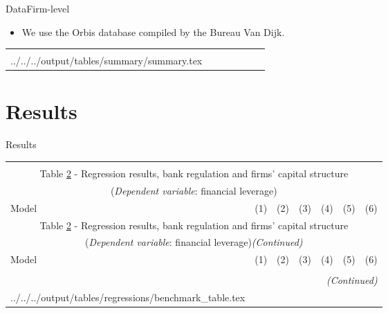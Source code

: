 \documentclass{beamer}
\makeatletter
\newcommand\primitiveinput[1]
{\@@input #1 }
\makeatother
\begin{document}
\begin{frame}{Data}{Firm-level}
\begin{itemize}
	\item We use the Orbis database compiled by the Bureau Van Dijk.
	
	
\end{itemize}
\begin{center}
	\begin{tiny}	
		\begin{longtable}{lcccccc}\\
			\label{reg:benchmark}\\
		\primitiveinput{../../../output/tables/summary/summary.tex}
			\hline 			
	\end{longtable}	
	\end{tiny}
\end{center}
\end{frame}

\section{Results}

\begin{frame}{Results}

{\fontsize{6}{7}\selectfont		
\begin{longtable}{lcccccc}\\
	\label{reg:benchmark}\\
	\multicolumn{7}{c}{Table \ref{reg:benchmark} - Regression results, bank regulation and firms' capital structure}\\
	\multicolumn{7}{c}{(\textit{Dependent variable}: financial leverage)}
	\\ \hline \hline \addlinespace
	Model & (1) & (2) & (3) & (4) & (5) & (6) \\  \endfirsthead
	\multicolumn{7}{c}{Table \ref{reg:benchmark} - Regression results, bank regulation and firms' capital structure }\\
	\multicolumn{7}{c}{(\textit{Dependent variable}: financial leverage)\textit{(Continued)}}
	\\ \hline \hline \addlinespace Model & (1) & (2) & (3) & (4) & (5) & (6) \\ \hline \\ \endhead
	\hline
	\multicolumn{7}{r}{{\textit{(Continued)}}}\\ \endfoot 
	\endlastfoot
	\primitiveinput{../../../output/tables/regressions/benchmark_table.tex}
	\hline 			
\end{longtable}		
}

\end{frame}
\end{document}

